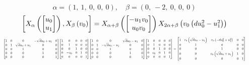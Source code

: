 \documentclass[11pt]{article}
\theoremstyle{definition}
\begin{document}
\[
\alpha = \left( 1, \  1, \  0, \  0, \  0\right), \quad \beta = \left( 0, \  -2, \  0, \  0, \  0\right)
\]
\[
\scaletoalign{\textwidth}{\left[ X_{\alpha}\left(\left[\begin{matrix}u_{0}\\u_{1}\end{matrix}\right]\right), X_{\beta}\left(v_{0}\right) \right] = X_{\alpha + \beta}\left(\left[\begin{matrix}- u_{1} v_{0}\\u_{0} v_{0}\end{matrix}\right]\right) X_{2\alpha + \beta}\left(v_{0} \left(d u_{0}^{2} - u_{1}^{2}\right)\right)}
\]
\[
\scaletoalign{\textwidth}{{\left[\begin{matrix}1 & 0 & 0 & - \sqrt{d} u_{0} + u_{1} & 0\\0 & 1 & \sqrt{d} u_{0} + u_{1} & 0 & 0\\0 & 0 & 1 & 0 & 0\\0 & 0 & 0 & 1 & 0\\0 & 0 & 0 & 0 & 1\end{matrix}\right]} {\left[\begin{matrix}1 & 0 & 0 & 0 & 0\\0 & 1 & 0 & 0 & 0\\0 & 0 & 1 & 0 & 0\\0 & - v_{0} & 0 & 1 & 0\\0 & 0 & 0 & 0 & 1\end{matrix}\right]} {\left[\begin{matrix}1 & 0 & 0 & \sqrt{d} u_{0} - u_{1} & 0\\0 & 1 & - \sqrt{d} u_{0} - u_{1} & 0 & 0\\0 & 0 & 1 & 0 & 0\\0 & 0 & 0 & 1 & 0\\0 & 0 & 0 & 0 & 1\end{matrix}\right]} {\left[\begin{matrix}1 & 0 & 0 & 0 & 0\\0 & 1 & 0 & 0 & 0\\0 & 0 & 1 & 0 & 0\\0 & v_{0} & 0 & 1 & 0\\0 & 0 & 0 & 0 & 1\end{matrix}\right]} = {\left[\begin{matrix}1 & v_{0} \left(\sqrt{d} u_{0} - u_{1}\right) & v_{0} \left(- d u_{0}^{2} + u_{1}^{2}\right) & 0 & 0\\0 & 1 & 0 & 0 & 0\\0 & 0 & 1 & 0 & 0\\0 & 0 & v_{0} \left(\sqrt{d} u_{0} + u_{1}\right) & 1 & 0\\0 & 0 & 0 & 0 & 1\end{matrix}\right]}}
\]
\end{document}
